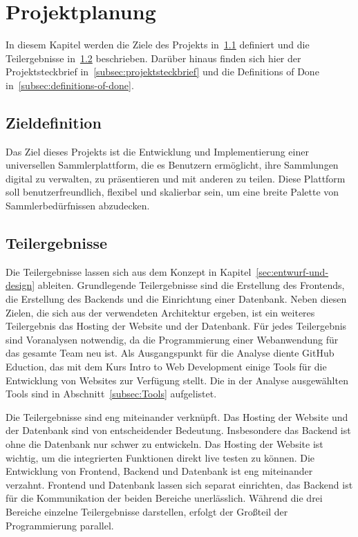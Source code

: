 \section{Projektplanung}\label{sec:projektplanung}

In diesem Kapitel werden die Ziele des Projekts in~\ref{subsec:zieldefinition} definiert und die Teilergebnisse in~\ref{subsec:teilergebnisses} beschrieben.
Darüber hinaus finden sich hier der Projektsteckbrief in~\ref{subsec:projektsteckbrief} und die Definitions of Done in~\ref{subsec:definitions-of-done}.

\subsection{Zieldefinition}\label{subsec:zieldefinition}
Das Ziel dieses Projekts ist die Entwicklung und Implementierung einer universellen Sammlerplattform, die es Benutzern ermöglicht, ihre Sammlungen digital zu verwalten, zu präsentieren und mit anderen zu teilen.
Diese Plattform soll benutzerfreundlich, flexibel und skalierbar sein, um eine breite Palette von Sammlerbedürfnissen abzudecken.

\subsection{Teilergebnisse}\label{subsec:teilergebnisses}
Die Teilergebnisse lassen sich aus dem Konzept in Kapitel~\ref{sec:entwurf-und-design} ableiten.
Grundlegende Teilergebnisse sind die Erstellung des Frontends, die Erstellung des Backends und die Einrichtung einer Datenbank.
Neben diesen Zielen, die sich aus der verwendeten Architektur ergeben, ist ein weiteres Teilergebnis das Hosting der Website und der Datenbank.
Für jedes Teilergebnis sind Voranalysen notwendig, da die Programmierung einer Webanwendung für das gesamte Team neu ist.
Als Ausgangspunkt für die Analyse diente GitHub Eduction, das mit dem Kurs Intro to Web Development einige Tools für die Entwicklung von Websites zur Verfügung stellt.
Die in der Analyse ausgewählten Tools sind in Abschnitt~\ref{subsec:Tools} aufgelistet.

Die Teilergebnisse sind eng miteinander verknüpft.
Das Hosting der Website und der Datenbank sind von entscheidender Bedeutung.
Insbesondere das Backend ist ohne die Datenbank nur schwer zu entwickeln.
Das Hosting der Website ist wichtig, um die integrierten Funktionen direkt live testen zu können.
Die Entwicklung von Frontend, Backend und Datenbank ist eng miteinander verzahnt.
Frontend und Datenbank lassen sich separat einrichten, das Backend ist für die Kommunikation der beiden Bereiche unerlässlich.
Während die drei Bereiche einzelne Teilergebnisse darstellen, erfolgt der Großteil der Programmierung parallel.


